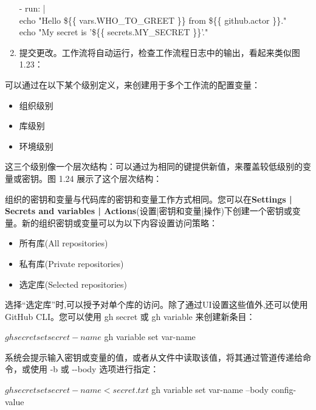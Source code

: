 \begin{enumerate}
\begin{tcolorbox}[ breakable,colback = bashcodebg, colframe= black!50!white]
\scriptsize{
- run: | \\
\hspace*{2em}echo "Hello \$\{\{ vars.WHO\_TO\_GREET \}\}  from \$\{\{ github.actor \}\}." \\
\hspace*{2em}echo "My secret is  '\$\{\{ secrets.MY\_SECRET \}\}'."
}
\end{tcolorbox}

\item 
提交更改。工作流将自动运行，检查工作流程日志中的输出，看起来类似图 1.23：


\end{enumerate}


可以通过在以下某个级别定义，来创建用于多个工作流的配置变量：

\begin{itemize}
\item 
组织级别

\item 
库级别

\item 
环境级别
\end{itemize}

这三个级别像一个层次结构：可以通过为相同的键提供新值，来覆盖较低级别的变量或密钥。图 1.24 展示了这个层次结构：


组织的密钥和变量与代码库的密钥和变量工作方式相同。您可以在\textbf{Settings | Secrets and variables | Actions}(设置|密钥和变量|操作)下创建一个密钥或变量。新的组织密钥或变量可以为以下内容设置访问策略：

\begin{itemize}
\item 
所有库(All repositories)

\item 
私有库(Private repositories)

\item 
选定库(Selected repositories)
\end{itemize}

选择“选定库”时,可以授予对单个库的访问。除了通过UI设置这些值外,还可以使用GitHub CLI。您可以使用 gh secret 或 gh variable 来创建新条目：

\begin{shell}
$ gh secret set secret-name
$ gh variable set var-name
\end{shell}

系统会提示输入密钥或变量的值，或者从文件中读取该值，将其通过管道传递给命令，或使用 -b 或 -{}-body 选项进行指定：

\begin{shell}
$ gh secret set secret-name < secret.txt
$ gh variable set var-name --body config-value
\end{shell}
